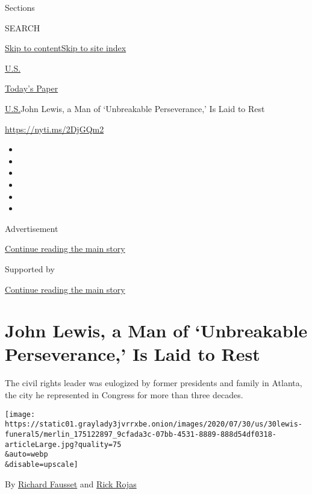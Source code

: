 Sections

SEARCH

\protect\hyperlink{site-content}{Skip to
content}\protect\hyperlink{site-index}{Skip to site index}

\href{https://www.nytimes3xbfgragh.onion/section/us}{U.S.}

\href{https://myaccount.nytimes3xbfgragh.onion/auth/login?response_type=cookie\&client_id=vi}{}

\href{https://www.nytimes3xbfgragh.onion/section/todayspaper}{Today's
Paper}

\href{/section/us}{U.S.}\textbar{}John Lewis, a Man of `Unbreakable
Perseverance,' Is Laid to Rest

\url{https://nyti.ms/2DjGQm2}

\begin{itemize}
\item
\item
\item
\item
\item
\item
\end{itemize}

Advertisement

\protect\hyperlink{after-top}{Continue reading the main story}

Supported by

\protect\hyperlink{after-sponsor}{Continue reading the main story}

\hypertarget{john-lewis-a-man-of-unbreakable-perseverance-is-laid-to-rest}{%
\section{John Lewis, a Man of `Unbreakable Perseverance,' Is Laid to
Rest}\label{john-lewis-a-man-of-unbreakable-perseverance-is-laid-to-rest}}

The civil rights leader was eulogized by former presidents and family in
Atlanta, the city he represented in Congress for more than three
decades.

\texttt{[image: https://static01.graylady3jvrrxbe.onion/images/2020/07/30/us/30lewis-funeral5/merlin\_175122897\_9cfada3c-07bb-4531-8889-888d54df0318-articleLarge.jpg?quality=75\\\&auto=webp\\\&disable=upscale]}

By \href{https://www.nytimes3xbfgragh.onion/by/richard-fausset}{Richard
Fausset} and
\href{https://www.nytimes3xbfgragh.onion/by/rick-rojas}{Rick Rojas}


